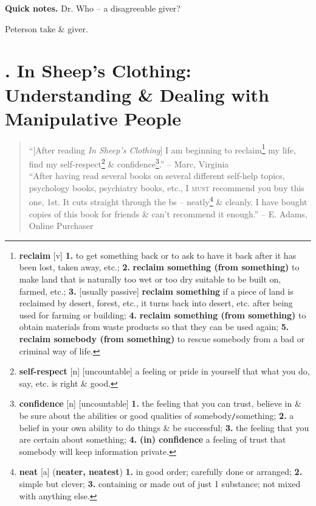 \documentclass[oneside]{book}
\numberwithin{equation}{section}
\begin{document}
\textbf{Quick notes.} Dr. Who -- a disagreeable giver?

Peterson take \& giver.


\chapter{\cite{Simon2010}. In Sheep's Clothing: Understanding \& Dealing with Manipulative People}

\begin{quotation}
	``[After reading \textit{In Sheep's Clothing}] I am beginning to reclaim\footnote{\textbf{reclaim} [v] \textbf{1.} to get something back or to ask to have it back after it has been lost, taken away, etc.; \textbf{2.} \textbf{reclaim something (from something)} to make land that is naturally too wet or too dry suitable to be built on, farmed, etc.; \textbf{3.} [usually passive] \textbf{reclaim something} if a piece of land is reclaimed by desert, forest, etc., it turns back into desert, etc. after being used for farming or building; \textbf{4.} \textbf{reclaim something (from something)} to obtain materials from waste products so that they can be used again; \textbf{5.} \textbf{reclaim somebody (from something)} to rescue somebody from a bad or criminal way of life.} my life, find my self-respect\footnote{\textbf{self-respect} [n] [uncountable] a feeling or pride in yourself that what you do, say, etc. is right \& good.} \& confidence\footnote{\textbf{confidence} [n] [uncountable] \textbf{1.} the feeling that you can trust, believe in \& be sure about the abilities or good qualities of somebody\texttt{/}something; \textbf{2.} a belief in your own ability to do things \& be successful; \textbf{3.} the feeling that you are certain about something; \textbf{4.} \textbf{(in) confidence} a feeling of trust that somebody will keep information private.}.'' -- Marc, Virginia\\
	
	``After having read several books on several different self-help topics, psychology books, psychiatry books, etc., \textsc{I must} recommend you buy this one, 1st. It cuts straight through the bs -- neatly\footnote{\textbf{neat} [a] (\textbf{neater, neatest}) \textbf{1.} in good order; carefully done or arranged; \textbf{2.} simple but clever; \textbf{3.} containing or made out of just 1 substance; not mixed with anything else.} \& cleanly. I have bought copies of this book for friends \& can't recommend it enough.'' -- E. Adams, Online Purchaser\\
	

\end{quotation}
\end{document}
